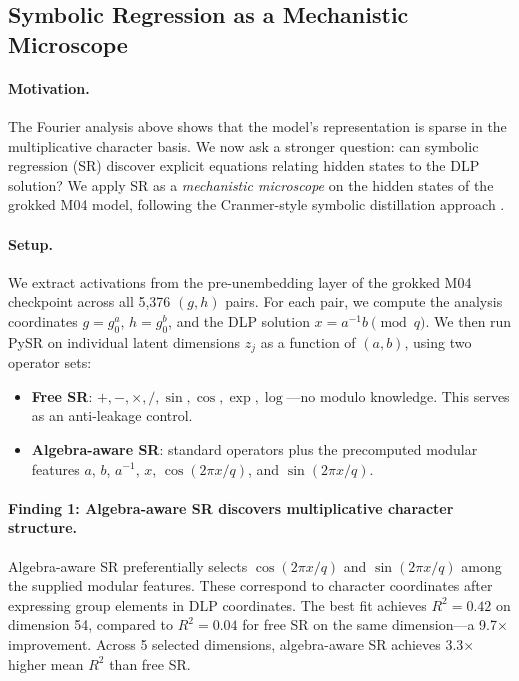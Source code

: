 \documentclass[11pt]{article}
\begin{document}
\subsection{Symbolic Regression as a Mechanistic Microscope}
\label{sec:symbolic}

\paragraph{Motivation.}
The Fourier analysis above shows that the model's representation is sparse in the multiplicative character basis. We now ask a stronger question: can symbolic regression (SR) discover explicit equations relating hidden states to the DLP solution? We apply SR as a \emph{mechanistic microscope} on the hidden states of the grokked M04 model, following the Cranmer-style symbolic distillation approach \citep{cranmer2020discovering}.

\paragraph{Setup.}
We extract activations from the pre-unembedding layer of the grokked M04 checkpoint across all 5,376 $(g, h)$ pairs. For each pair, we compute the analysis coordinates $g = g_0^a$, $h = g_0^b$, and the DLP solution $x = a^{-1} b \pmod{q}$. We then run PySR \citep{cranmer2023interpretable} on individual latent dimensions $z_j$ as a function of $(a, b)$, using two operator sets:
\begin{itemize}[leftmargin=*]
    \item \textbf{Free SR}: $+, -, \times, /, \sin, \cos, \exp, \log$---no modulo knowledge. This serves as an anti-leakage control.
    \item \textbf{Algebra-aware SR}: standard operators plus the precomputed modular features $a$, $b$, $a^{-1}$, $x$, $\cos(2\pi x/q)$, and $\sin(2\pi x/q)$.
\end{itemize}

\paragraph{Finding 1: Algebra-aware SR discovers multiplicative character structure.}
Algebra-aware SR preferentially selects $\cos(2\pi x/q)$ and $\sin(2\pi x/q)$ among the supplied modular features. These correspond to character coordinates after expressing group elements in DLP coordinates. The best fit achieves $R^2 = 0.42$ on dimension 54, compared to $R^2 = 0.04$ for free SR on the same dimension---a 9.7$\times$ improvement. Across 5 selected dimensions, algebra-aware SR achieves 3.3$\times$ higher mean $R^2$ than free SR.
\end{document}
